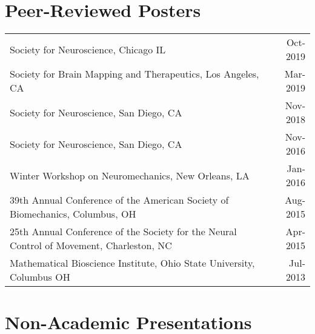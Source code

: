\documentclass[10pt,a4paper]{article}
\begin{document}
\vspace*{2mm}\section*{Peer-Reviewed Posters}

  \vspace*{1mm}\noindent\begin{tabularx}{17cm}{X r}
    Society for Neuroscience, Chicago IL & Oct-2019 \\ %
    Society for Brain Mapping and Therapeutics, Los Angeles, CA & Mar-2019 \\ %
    Society for Neuroscience, San Diego, CA & Nov-2018 \\ %
    Society for Neuroscience, San Diego, CA& Nov-2016 \\ 
    Winter Workshop on Neuromechanics, New Orleans, LA & Jan-2016 \\ %
    39th Annual Conference of the American Society of Biomechanics, Columbus, OH & Aug-2015 \\
    25th Annual Conference of the Society for the Neural Control of Movement, Charleston, NC & Apr-2015 \\
    Mathematical Bioscience Institute, Ohio State University, Columbus OH & Jul-2013\\
  \end{tabularx}


  \vspace*{2mm}\section*{Non-Academic Presentations}
\end{document}
